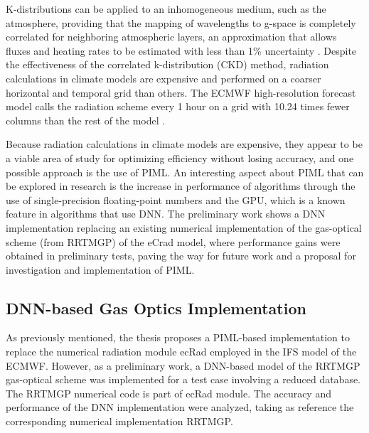 K-distributions can be applied to an inhomogeneous medium, such as the atmosphere, providing that the mapping of wavelengths to g-space is completely correlated for neighboring atmospheric layers, an approximation that allows fluxes and heating rates to be estimated with less than 1\% uncertainty \cite{Fu1992}. Despite the effectiveness of the correlated k-distribution (CKD) method, radiation calculations in climate models are expensive and performed on a coarser horizontal and temporal grid than others. The ECMWF high-resolution forecast model calls the radiation scheme every 1 hour on a grid with 10.24 times fewer columns than the rest of the model \cite{Hogan2018}.

Because radiation calculations in climate models are expensive, they appear to be a viable area of study for optimizing efficiency without losing accuracy, and one possible approach is the use of PIML.
An interesting aspect about PIML that can be explored in research is the increase in performance of algorithms through the use of single-precision floating-point numbers and the GPU, which is a known feature in algorithms that use DNN.
The preliminary work shows a DNN implementation replacing an existing numerical implementation of the gas-optical scheme (from RRTMGP) of the eCrad model, where performance gains were obtained in preliminary tests, paving the way for future work and a proposal for investigation and implementation of PIML.


\subsection{DNN-based Gas Optics Implementation}
\label{sec:mgom}

As previously mentioned, the thesis proposes a PIML-based implementation to replace the numerical radiation module ecRad employed in the IFS model of the ECMWF. However, as a preliminary work, a DNN-based model of the RRTMGP gas-optical scheme was implemented for a test case involving a reduced database. The RRTMGP numerical code is part of ecRad module. The accuracy and performance of the DNN implementation were analyzed, taking as reference the corresponding numerical implementation RRTMGP.

